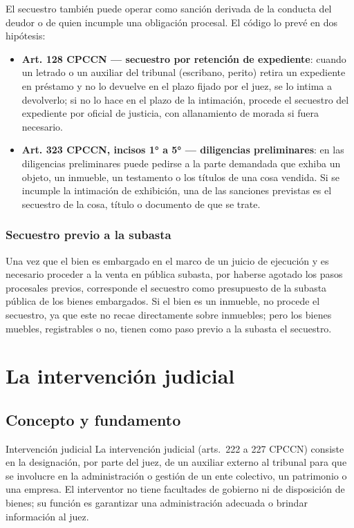 \documentclass[12pt,oneside]{book}
\begin{document}
El secuestro también puede operar como sanción derivada de la conducta del deudor o de quien incumple una obligación procesal. El código lo prevé en dos hipótesis:

\begin{itemize}
    \item \textbf{Art. 128 CPCCN --- secuestro por retención de expediente}: cuando un letrado o un auxiliar del tribunal (escribano, perito) retira un expediente en préstamo y no lo devuelve en el plazo fijado por el juez, se lo intima a devolverlo; si no lo hace en el plazo de la intimación, procede el secuestro del expediente por oficial de justicia, con allanamiento de morada si fuera necesario.
    \item \textbf{Art. 323 CPCCN, incisos 1° a 5° --- diligencias preliminares}: en las diligencias preliminares puede pedirse a la parte demandada que exhiba un objeto, un inmueble, un testamento o los títulos de una cosa vendida. Si se incumple la intimación de exhibición, una de las sanciones previstas es el secuestro de la cosa, título o documento de que se trate.
\end{itemize}

\subsection{Secuestro previo a la subasta}

Una vez que el bien es embargado en el marco de un juicio de ejecución y es necesario proceder a la venta en pública subasta, por haberse agotado los pasos procesales previos, corresponde el secuestro como presupuesto de la subasta pública de los bienes embargados. Si el bien es un inmueble, no procede el secuestro, ya que este no recae directamente sobre inmuebles; pero los bienes muebles, registrables o no, tienen como paso previo a la subasta el secuestro.

\chapter{La intervención judicial}

\section{Concepto y fundamento}

\begin{definition}{Intervención judicial}
La intervención judicial (arts.\ 222 a 227 CPCCN) consiste en la designación, por parte del juez, de un auxiliar externo al tribunal para que se involucre en la administración o gestión de un ente colectivo, un patrimonio o una empresa. El interventor no tiene facultades de gobierno ni de disposición de bienes; su función es garantizar una administración adecuada o brindar información al juez.
\end{definition}
\end{document}
